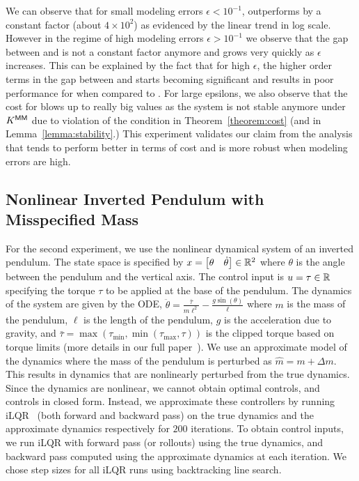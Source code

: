 We can observe that for small modeling errors $\epsilon < 10^{-1}$, \ILC{}
outperforms \MM{} by a constant factor (about $4\times 10^{2}$) as evidenced by the linear
trend in log scale. However in the regime of high modeling errors
$\epsilon > 10^{-1}$ we observe that the gap between \ILC{} and \MM{} is not a
constant factor anymore and grows very quickly as $\epsilon$ increases. This can
be explained by the fact that for high $\epsilon$, the
higher order terms in the gap between \ILC{} and \MM{} starts becoming significant
and results in poor performance for \MM{} when compared to \ILC{}. For large epsilons,
we also observe that the cost for \MM{} blows up to really big values as the system
is not stable anymore under $K^\mathsf{MM}$ due to violation of the condition
in Theorem~\ref{theorem:cost} (and in
Lemma~\ref{lemma:stability}.) This experiment validates our claim from the
analysis that \ILC{} tends to perform better in terms of cost and is more robust
when modeling errors are high.

\subsection{Nonlinear Inverted Pendulum with Misspecified Mass}
\label{sec:invert-pend-with}

For the second experiment, we use the nonlinear dynamical system of an inverted
pendulum. The state space is specified by $x =
\begin{bmatrix}
  \theta &
  \dot{\theta}
\end{bmatrix} \in \mathbb{R}^{2}
$ where $\theta$ is the angle between the pendulum and the vertical axis. The
control input is $u = \tau \in \mathbb{R}$ specifying the torque $\tau$ to be
applied at the base of the pendulum. The dynamics of the system are
given by the ODE,
$\ddot{\theta} = \frac{\bar{\tau}}{m\ell^{2}} - \frac{g\sin(\theta)}{\ell}$
where $m$ is the mass of the pendulum, $\ell$ is the length of the pendulum, $g$
is the acceleration due to gravity, and
$\bar{\tau} = \max(\tau_{\min}, \min(\tau_{\max}, \tau))$ is the clipped torque
based on torque limits (more details in
our full paper~\cite{DBLP:journals/corr/abs-2111-09434}). 
We use an approximate model of the dynamics where the mass of the pendulum is
perturbed as $\hat{m} = m + \Delta m$.
This results in dynamics that are nonlinearly perturbed from the true dynamics.
Since the dynamics are nonlinear, we cannot obtain
optimal controls, and \MM{} controls in closed form. Instead, we approximate these
controllers by running iLQR~\cite{li04} (both forward and backward pass) on the
true dynamics and the approximate
dynamics respectively for $200$ iterations. To obtain \ILC{} control inputs, we run
iLQR with forward pass (or rollouts)
using the true dynamics, and backward pass computed using the approximate
dynamics at each iteration.
We chose step sizes for all iLQR runs using
backtracking line search.


